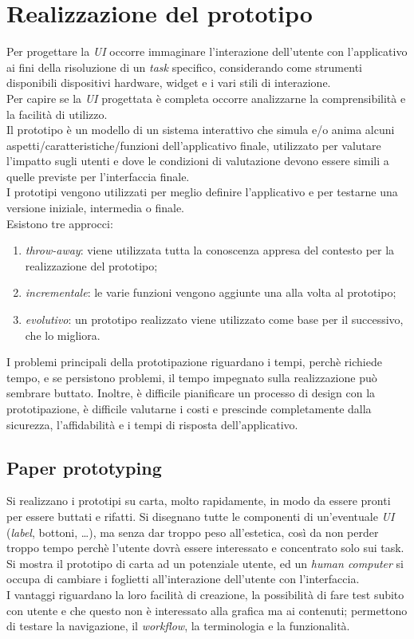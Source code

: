 \section{Realizzazione del prototipo}
Per progettare la \textit{UI} occorre immaginare l'interazione dell'utente con l'applicativo ai fini della risoluzione di un \textit{task} specifico, considerando come strumenti disponibili dispositivi hardware, widget e i vari stili di interazione. \\
Per capire se la \textit{UI} progettata \`e completa occorre analizzarne la comprensibilit\`a e la facilit\`a di utilizzo. \\
Il prototipo \`e un modello di un sistema interattivo che simula e/o anima alcuni aspetti/caratteristiche/funzioni dell'applicativo finale, utilizzato per valutare l'impatto sugli utenti e dove le condizioni di valutazione devono essere simili a quelle previste per l'interfaccia finale. \\
I prototipi vengono utilizzati per meglio definire l'applicativo e per testarne una versione iniziale, intermedia o finale. \\
Esistono tre approcci:
\begin{enumerate}
	\item \textit{throw-away}: viene utilizzata tutta la conoscenza appresa del contesto per la realizzazione del prototipo;
	\item \textit{incrementale}: le varie funzioni vengono aggiunte una alla volta al prototipo;
	\item \textit{evolutivo}: un prototipo realizzato viene utilizzato come base per il successivo, che lo migliora.
\end{enumerate}
I problemi principali della prototipazione riguardano i tempi, perch\`e richiede tempo, e se persistono problemi, il tempo impegnato sulla realizzazione pu\`o sembrare buttato. Inoltre, \`e difficile pianificare un processo di design con la prototipazione, \`e difficile valutarne i costi e prescinde completamente dalla sicurezza, l'affidabilit\`a e i tempi di risposta dell'applicativo.

\subsection{Paper prototyping}
Si realizzano i prototipi su carta, molto rapidamente, in modo da essere pronti per essere buttati e rifatti. Si disegnano tutte le componenti di un'eventuale \textit{UI} (\textit{label}, bottoni, \ldots), ma senza dar troppo peso all'estetica, cos\`i da non perder troppo tempo perch\`e l'utente dovr\`a essere interessato e concentrato solo sui task. \\
Si mostra il prototipo di carta ad un potenziale utente, ed un \textit{human computer} si occupa di cambiare i foglietti all'interazione dell'utente con l'interfaccia. \\
I vantaggi riguardano la loro facilit\`a di creazione, la possibilit\`a di fare test subito con utente e che questo non \`e interessato alla grafica ma ai contenuti; permettono di testare la navigazione, il \textit{workflow}, la terminologia e la funzionalit\`a.

